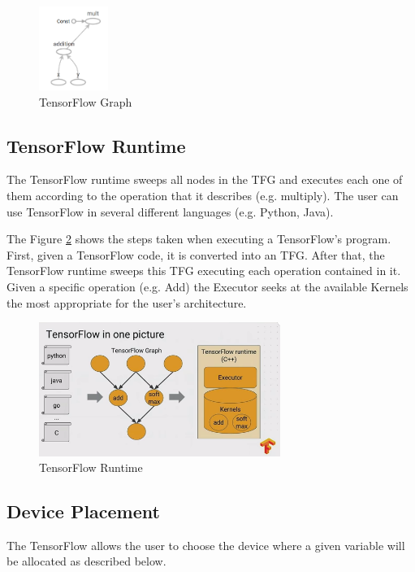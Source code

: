 \documentclass[11pt, fleqn]{article}
\begin{document}
\begin{figure}[H]
    \centering
    \includegraphics[width=0.2\textwidth]{img/tfg_example.png}
    \caption{TensorFlow Graph}
    \label{fig:tfg_ex}
\end{figure}


\subsection{TensorFlow Runtime}
The TensorFlow runtime sweeps all nodes in the TFG and executes each one of them according to the operation
that it describes (e.g. multiply). The user can use TensorFlow in several different languages (e.g. Python, Java). 

The Figure \ref{fig:tfg_runtime} shows the steps taken when executing a TensorFlow's program. 
First, given a TensorFlow code, it is converted into an TFG. After that, the TensorFlow runtime sweeps
this TFG executing each operation contained in it.  
Given a specific operation (e.g. Add) the Executor seeks at the available Kernels the most 
appropriate for the user's architecture.


\begin{figure}[H]
    \centering
    \includegraphics[width=0.7\textwidth]{img/tf_runtime.png}
    \caption{TensorFlow Runtime}
    \label{fig:tfg_runtime}
\end{figure}


\subsection{Device Placement}

The TensorFlow allows the user to choose the device where a given variable will be allocated as described below.
\end{document}
